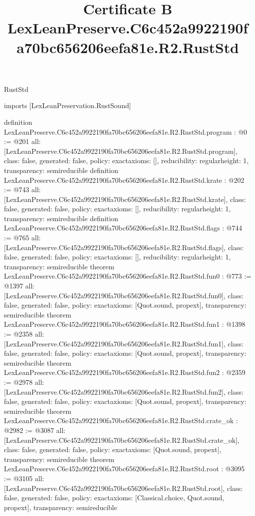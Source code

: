 \begin{lexlean}{RustStd}
\title{Certificate B LexLeanPreserve.C6c452a9922190fa70bc656206eefa81e.R2.RustStd}
\begin{coremodule}
imports [LexLeanPreservation.RustSound]

definition LexLeanPreserve.C6c452a9922190fa70bc656206eefa81e.R2.RustStd.program : @0 := @201 {
  all: [LexLeanPreserve.C6c452a9922190fa70bc656206eefa81e.R2.RustStd.program],
  class: false,
  generated: false,
  policy: exact{axioms: []},
  reducibility: regular{height: 1},
  transparency: semireducible
}
definition LexLeanPreserve.C6c452a9922190fa70bc656206eefa81e.R2.RustStd.krate : @202 := @743 {
  all: [LexLeanPreserve.C6c452a9922190fa70bc656206eefa81e.R2.RustStd.krate],
  class: false,
  generated: false,
  policy: exact{axioms: []},
  reducibility: regular{height: 1},
  transparency: semireducible
}
definition LexLeanPreserve.C6c452a9922190fa70bc656206eefa81e.R2.RustStd.flags : @744 := @765 {
  all: [LexLeanPreserve.C6c452a9922190fa70bc656206eefa81e.R2.RustStd.flags],
  class: false,
  generated: false,
  policy: exact{axioms: []},
  reducibility: regular{height: 1},
  transparency: semireducible
}
theorem LexLeanPreserve.C6c452a9922190fa70bc656206eefa81e.R2.RustStd.fun0 : @773 := @1397 {
  all: [LexLeanPreserve.C6c452a9922190fa70bc656206eefa81e.R2.RustStd.fun0],
  class: false,
  generated: false,
  policy: exact{axioms: [Quot.sound, propext]},
  transparency: semireducible
}
theorem LexLeanPreserve.C6c452a9922190fa70bc656206eefa81e.R2.RustStd.fun1 : @1398 := @2358 {
  all: [LexLeanPreserve.C6c452a9922190fa70bc656206eefa81e.R2.RustStd.fun1],
  class: false,
  generated: false,
  policy: exact{axioms: [Quot.sound, propext]},
  transparency: semireducible
}
theorem LexLeanPreserve.C6c452a9922190fa70bc656206eefa81e.R2.RustStd.fun2 : @2359 := @2978 {
  all: [LexLeanPreserve.C6c452a9922190fa70bc656206eefa81e.R2.RustStd.fun2],
  class: false,
  generated: false,
  policy: exact{axioms: [Quot.sound, propext]},
  transparency: semireducible
}
theorem LexLeanPreserve.C6c452a9922190fa70bc656206eefa81e.R2.RustStd.crate_ok : @2982 := @3087 {
  all: [LexLeanPreserve.C6c452a9922190fa70bc656206eefa81e.R2.RustStd.crate_ok],
  class: false,
  generated: false,
  policy: exact{axioms: [Quot.sound, propext]},
  transparency: semireducible
}
theorem LexLeanPreserve.C6c452a9922190fa70bc656206eefa81e.R2.RustStd.root : @3095 := @3105 {
  all: [LexLeanPreserve.C6c452a9922190fa70bc656206eefa81e.R2.RustStd.root],
  class: false,
  generated: false,
  policy: exact{axioms: [Classical.choice, Quot.sound, propext]},
  transparency: semireducible
}


\end{coremodule}
\end{lexlean}
